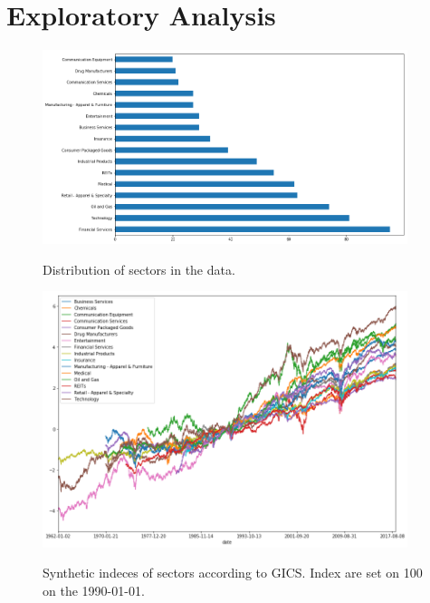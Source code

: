 \documentclass[a4paper,twoside]{article}
\begin{document}
\section{Exploratory Analysis}
\label{sec:org822fc2e}

\begin{figure}    
\begin{center}
  \label{fig:distribution-sectors}
  \includegraphics[width=0.95\textwidth]{figures/sectors_distribution}
  \caption{Distribution of sectors in the data.}
  \end{center}
\end{figure}

\begin{figure}    
\begin{center}
  \label{fig:gics-level}
  \includegraphics[width=0.95\textwidth]{figures/indexes_level}
  \caption{Synthetic indeces of sectors according to GICS. Index are set on 100 on the 1990-01-01.}
  \end{center}
\end{figure}
\end{document}
